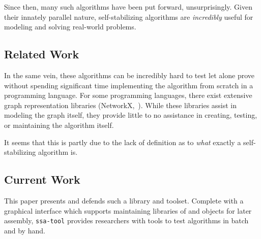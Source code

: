 Since then, many such algorithms have been put forward, unsurprisingly.
Given their innately parallel nature,
  self-stabilizing algorithms are \emph{incredibly} useful
  for modeling and solving real-world problems.

\subsection{Related Work}
\label{sec:introduction:related-work}
In the same vein, these algorithms can be incredibly hard to test
  \Dash let alone prove \Dash
  without spending significant time implementing the algorithm
  from scratch in a programming language.
For some programming languages,
  there exist extensive graph representation libraries (\eg NetworkX,~\autocite{hagberg:networkx}).
While these libraries assist in modeling the graph itself,
  they provide little to no assistance in creating, testing, or maintaining the algorithm itself.

It seems that this is partly due to the lack of definition as to \emph{what} exactly a self-stabilizing algorithm is.

\subsection{Current Work}
\label{sec:introduction:current-work}
This paper presents and defends such a library and toolset.
Complete with a graphical interface which supports
  maintaining libraries of  and  objects for later assembly,
  \texttt{ssa-tool} provides researchers with tools to test algorithms in batch and by hand.

